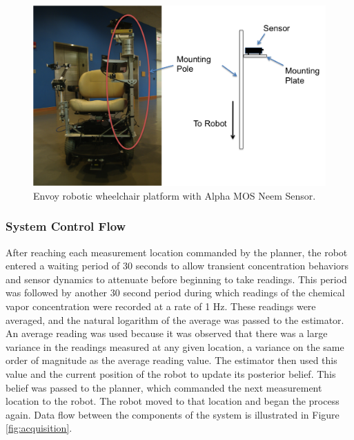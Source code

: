 \documentclass[submit, 12pt]{aiaa-pretty-modified}
\begin{document}
\begin{figure}
\begin{center}
\includegraphics[width=5in]{img/wheelchair.pdf}
\caption{Envoy robotic wheelchair platform with Alpha MOS Neem Sensor.}
\label{fig:wheelchair}
\end{center}
\end{figure}

\FloatBarrier

\label{sec:mount}

\subsubsection{System Control Flow}

After reaching each measurement location commanded by the planner, the robot
entered a waiting period of 30 seconds to allow transient concentration
behaviors and sensor dynamics to attenuate before beginning to take readings.
This period was followed by another 30 second period during which readings of
the chemical vapor concentration were recorded at a rate of 1 Hz. These readings
were averaged, and the natural logarithm of the average was passed to the
estimator. An average reading was used because it was observed that there was a
large variance in the readings measured at any given location, a variance on the
same order of magnitude as the average reading value. The estimator then used
this value and the current position of the robot to update its posterior belief.
This belief was passed to the planner, which commanded the next measurement
location to the robot. The robot moved to that location and began the process
again. Data flow between the components of the system is illustrated in Figure
\ref{fig:acquisition}.
\end{document}
